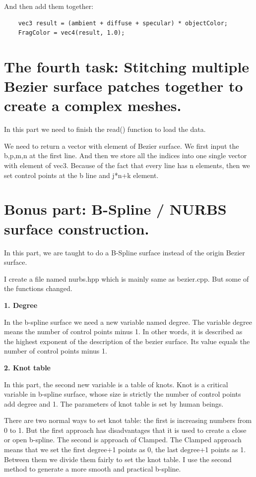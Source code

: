\documentclass[acmtog]{acmart}
\begin{document}
And then add them together:

\begin{lstlisting}
	vec3 result = (ambient + diffuse + specular) * objectColor;
    FragColor = vec4(result, 1.0);
\end{lstlisting}

\section{The fourth task: Stitching multiple Bezier surface patches together to create a complex meshes.}

In this part we need to finish the read() function to load the data.

We need to return a vector with element of Bezier surface. We first input the b,p,m,n at the first line.
And then we store all the indices into one single vector with element of vec3. Because of the fact that every
line has n elements, then we set control points at the b line and j*n+k element.

\section{Bonus part: B-Spline / NURBS surface construction.}

In this part, we are taught to do a B-Spline surface instead of the origin Bezier surface.

I create a file named nurbs.hpp which is mainly same as bezier.cpp. But some of the functions changed.

\textbf{1. Degree}

In the b-spline surface we need a new variable named degree. The variable degree means the number of control points
minus 1. In other words, it is described as the highest exponent of the description of the bezier surface.
Its value equals the number of control points minus 1.

\textbf{2. Knot table}

In this part, the second new variable is a table of knots. Knot is a critical variable in b-spline surface, whose size
is strictly the number of control points add degree and 1. The parameters of knot table is set by human beings.

There are two normal ways to set knot table: the first is increasing numbers from 0 to 1. But the first approach has 
disadvantages that it is used to create a close or open b-spline. The second is approach of Clamped. The Clamped approach 
means that we set the first degree+1 points as 0, the last degree+1 points as 1. Between them we divide them fairly to set
the knot table. I use the second method to generate a more smooth and practical b-spline.
\end{document}
